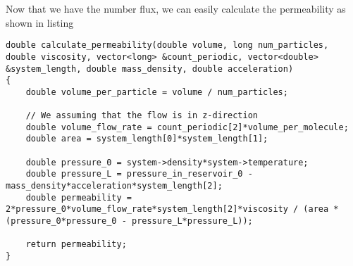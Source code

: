 Now that we have the number flux, we can easily calculate the permeability as shown in listing 
\begin{lstlisting}[caption=Calculation of permeability\, assuming that flow is in the $z$-direction., label=lst:dsmc_permeability]
double calculate_permeability(double volume, long num_particles, double viscosity, vector<long> &count_periodic, vector<double> &system_length, double mass_density, double acceleration)
{	
    double volume_per_particle = volume / num_particles;

    // We assuming that the flow is in z-direction
    double volume_flow_rate = count_periodic[2]*volume_per_molecule;
    double area = system_length[0]*system_length[1];

    double pressure_0 = system->density*system->temperature;
    double pressure_L = pressure_in_reservoir_0 - mass_density*acceleration*system_length[2];
    double permeability = 2*pressure_0*volume_flow_rate*system_length[2]*viscosity / (area * (pressure_0*pressure_0 - pressure_L*pressure_L));

    return permeability;
}
\end{lstlisting}